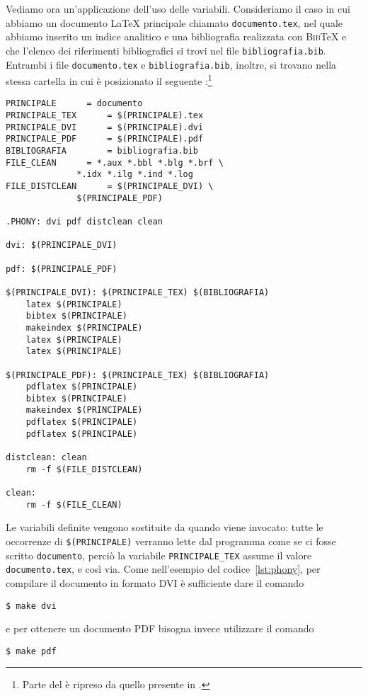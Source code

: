 Vediamo ora un'applicazione dell'uso delle variabili.  Consideriamo il caso in
cui abbiamo un documento \LaTeX{}
principale chiamato \texttt{documento.tex}, nel quale abbiamo inserito un indice
analitico e una bibliografia realizzata con \textsc{Bib}\TeX{}
e che l'elenco dei riferimenti bibliografici si trovi nel file
\texttt{bibliografia.bib}.  Entrambi i file \texttt{documento.tex} e
\texttt{bibliografia.bib}, inoltre, si trovano nella stessa cartella in cui è
posizionato il seguente
:\footnote{Parte del  è ripreso da
  quello presente in \cite[pagina 61]{caucci:tabelle}.}
\begin{lstlisting}[caption={Esempio di \filestyle{Makefile} che utilizza le
variabili.},label=lst:variabili]
PRINCIPALE 		= documento
PRINCIPALE_TEX		= $(PRINCIPALE).tex
PRINCIPALE_DVI		= $(PRINCIPALE).dvi
PRINCIPALE_PDF		= $(PRINCIPALE).pdf
BIBLIOGRAFIA		= bibliografia.bib
FILE_CLEAN		= *.aux *.bbl *.blg *.brf \
			  *.idx *.ilg *.ind *.log
FILE_DISTCLEAN		= $(PRINCIPALE_DVI) \
			  $(PRINCIPALE_PDF)

.PHONY: dvi pdf distclean clean

dvi: $(PRINCIPALE_DVI)

pdf: $(PRINCIPALE_PDF)

$(PRINCIPALE_DVI): $(PRINCIPALE_TEX) $(BIBLIOGRAFIA)
	latex $(PRINCIPALE)
	bibtex $(PRINCIPALE)
	makeindex $(PRINCIPALE)
	latex $(PRINCIPALE)
	latex $(PRINCIPALE)

$(PRINCIPALE_PDF): $(PRINCIPALE_TEX) $(BIBLIOGRAFIA)
	pdflatex $(PRINCIPALE)
	bibtex $(PRINCIPALE)
	makeindex $(PRINCIPALE)
	pdflatex $(PRINCIPALE)
	pdflatex $(PRINCIPALE)

distclean: clean
	rm -f $(FILE_DISTCLEAN)

clean:
	rm -f $(FILE_CLEAN)
\end{lstlisting}
Le variabili definite vengono sostituite da  quando viene
invocato: tutte le occorrenze di \texttt{\$(PRINCIPALE)} verranno lette dal
programma come se ci fosse scritto \texttt{documento}, perciò la variabile
\texttt{PRINCIPALE\_TEX} assume il valore \texttt{documento.tex}, e così
via. Come nell'esempio del codice~\ref{lst:phony}, per compilare il documento in
formato \textsc{DVI} è sufficiente dare il comando
\begin{verbatim}
$ make dvi
\end{verbatim}
e per ottenere un documento \textsc{PDF} bisogna invece utilizzare il comando
\begin{verbatim}
$ make pdf
\end{verbatim}

